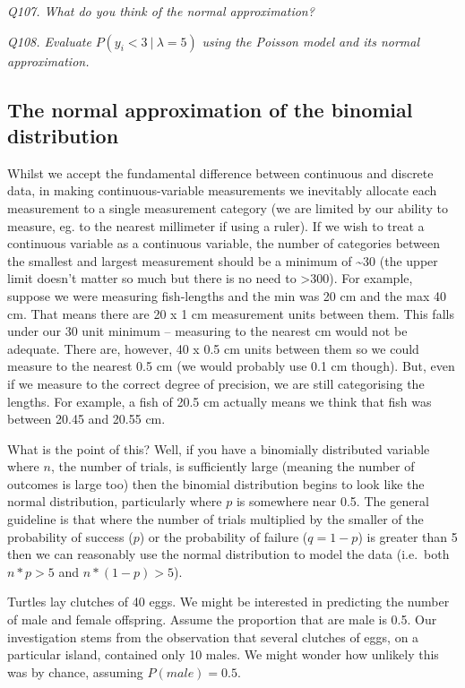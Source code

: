 \documentclass[
  11pt,
  a4paper,
]{book}
\begin{document}
\emph{Q107. What do you think of the normal approximation?}

\emph{Q108. Evaluate} \(P(y_i<3\ |\ \lambda=5)\) \emph{using the Poisson model and its normal approximation.}

\hypertarget{the-normal-approximation-of-the-binomial-distribution}{%
\subsection{The normal approximation of the binomial distribution}\label{the-normal-approximation-of-the-binomial-distribution}}

Whilst we accept the fundamental difference between continuous and discrete data, in making continuous-variable measurements we inevitably allocate each measurement to a single measurement category (we are limited by our ability to measure, eg. to the nearest millimeter if using a ruler). If we wish to treat a continuous variable as a continuous variable, the number of categories between the smallest and largest measurement should be a minimum of \textasciitilde30 (the upper limit doesn't matter so much but there is no need to \textgreater300). For example, suppose we were measuring fish-lengths and the min was 20 cm and the max 40 cm. That means there are 20 x 1 cm measurement units between them. This falls under our 30 unit minimum -- measuring to the nearest cm would not be adequate. There are, however, 40 x 0.5 cm units between them so we could measure to the nearest 0.5 cm (we would probably use 0.1 cm though). But, even if we measure to the correct degree of precision, we are still categorising the lengths. For example, a fish of 20.5 cm actually means we think that fish was between 20.45 and 20.55 cm.

What is the point of this? Well, if you have a binomially distributed variable where \(n\), the number of trials, is sufficiently large (meaning the number of outcomes is large too) then the binomial distribution begins to look like the normal distribution, particularly where \(p\) is somewhere near 0.5. The general guideline is that where the number of trials multiplied by the smaller of the probability of success (\(p\)) or the probability of failure (\(q=1-p\)) is greater than 5 then we can reasonably use the normal distribution to model the data (i.e.~both \(n*p > 5\) and \(n*(1-p) > 5\)).

Turtles lay clutches of 40 eggs. We might be interested in predicting the number of male and female offspring. Assume the proportion that are male is 0.5. Our investigation stems from the observation that several clutches of eggs, on a particular island, contained only 10 males. We might wonder how unlikely this was by chance, assuming \(P(male)=0.5\).
\end{document}
